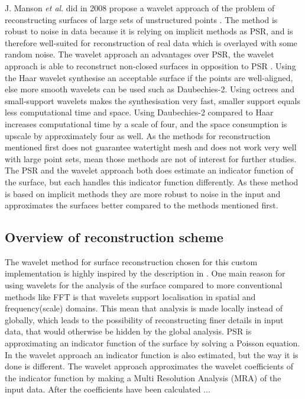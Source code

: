 J. Manson \textit{et al}. did in 2008 propose a wavelet approach of the problem of reconstructing surfaces of large sets of unstructured points \cite{Manson2008}. The method is robust to noise in data because it is relying on implicit methods as PSR, and is therefore well-suited for reconstruction of real data which is overlayed with some random noise. The wavelet approach an advantages over PSR, the wavelet approach is able to reconstruct non-closed surfaces in opposition to PSR \cite{Kazhdan2006}. Using the Haar wavelet synthesise an acceptable surface if the points are well-aligned, else more smooth wavelets can be used such as Daubechies-2. Using octrees and small-support wavelets makes the synthesisation very fast, smaller support equals less computational time and space. Using Daubechies-2 compared to Haar increases computational time by a scale of four, and the space consumption is upscale by approximately four as well. As the methods for reconstruction mentioned first does not guarantee watertight mesh and does not work very well with large point sets, mean those methods are not of interest for further studies. The PSR and the wavelet approach both does estimate an indicator function of the surface, but each handles this indicator function differently. As these method is based on implicit methods they are more robust to noise in the input and approximates the surfaces better compared to the methods mentioned first.

\subsection{Overview of reconstruction scheme}
The wavelet method for surface reconstruction chosen for this custom implementation is highly inspired by the description in \cite{Manson2008}. One main reason for using wavelets for the analysis of the surface compared to more conventional methods like FFT is that wavelets support localisation in spatial and frequency(scale) domains. This mean that analysis is made locally instead of globally, which leads to the possibility of reconstructing finer details in input data, that would otherwise be hidden by the global analysis. PSR is approximating an indicator function of the surface by solving a Poisson equation. In the wavelet approach an indicator function is also estimated, but the way it is done is different. The wavelet approach approximates the wavelet coefficients of the indicator function by making a Multi Resolution Analysis (MRA) of the input data. After the coefficients have been calculated ...

